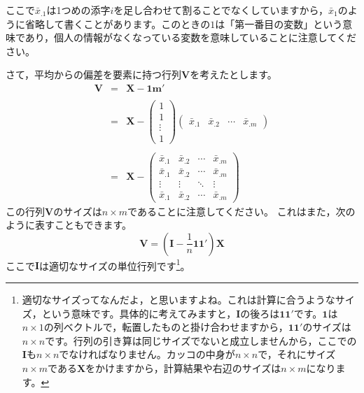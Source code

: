 \documentclass{ltjsbook}
\begin{document}
ここで$\bar{x}_{.1}$は1つめの添字$i$を足し合わせて割ることでなくしていますから，$\bar{x}_1$のように省略して書くことがあります。このときの$1$は「第一番目の変数」という意味であり，個人の情報がなくなっている変数を意味していることに注意してください。

さて，平均からの偏差を要素に持つ行列$\bm{V}$を考えたとします。
\[
	\begin{array}{ccl}
		\bm{V} & = & \bm{X} - \bm{1} \bm{m}'                                                                                                                        \\
		       &   &                                                                                                                                                \\
		       & = & \bm{X} - \begin{pmatrix} 1 \\ 1 \\ \vdots \\ 1 \end{pmatrix} \begin{pmatrix} \bar{x}_{.1} & \bar{x}_{.2} & \cdots & \bar{x}_{.m} \end{pmatrix} \\
		       &   &                                                                                                                                                \\
		       & = & \bm{X} - \begin{pmatrix} \bar{x}_{.1} & \bar{x}_{.2} & \cdots & \bar{x}_{.m} \\
                \bar{x}_{.1} & \bar{x}_{.2} & \cdots & \bar{x}_{.m} \\
                \vdots       & \vdots       & \ddots & \vdots       \\
                \bar{x}_{.1} & \bar{x}_{.2} & \cdots & \bar{x}_{.m}\end{pmatrix}
	\end{array}
\]
この行列$\bm{V}$のサイズは$n \times m$であることに注意してください。
これはまた，次のように表すこともできます。
\[ \bm{V} = ( \bm{I} -\frac{1}{n}\bm{1} \bm{1} ')\bm{X} \]
ここで$\bm{I}$は適切なサイズの単位行列です\footnote{適切なサイズってなんだよ，と思いますよね。これは計算に合うようなサイズ，という意味です。具体的に考えてみますと，$\bm{I}$の後ろは$\bm{1}\bm{1}'$です。$\bm{1}$は$n\times 1$の列ベクトルで，転置したものと掛け合わせますから，$\bm{1}\bm{1}'$のサイズは$n \times n$です。行列の引き算は同じサイズでないと成立しませんから，ここでの$\bm{I}$も$n \times n$でなければなりません。カッコの中身が$n \times n$で，それにサイズ$n \times m$である$\bm{X}$をかけますから，計算結果や右辺のサイズは$n \times m$になります。}。
\end{document}
